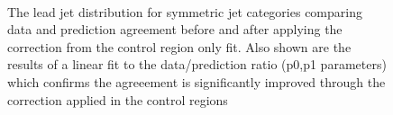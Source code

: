 \begin{figure}[tbhp]
    \begin{center}
         ~~
        \\
        \caption{The lead jet \pt distribution for symmetric jet categories comparing data and prediction agreement before and after applying the correction from the control region only fit. Also shown are the results of a linear fit to the data/prediction ratio (p0,p1 parameters) which confirms the agreeement is significantly improved through the correction applied in the control regions}
    \end{center}
\end{figure}
